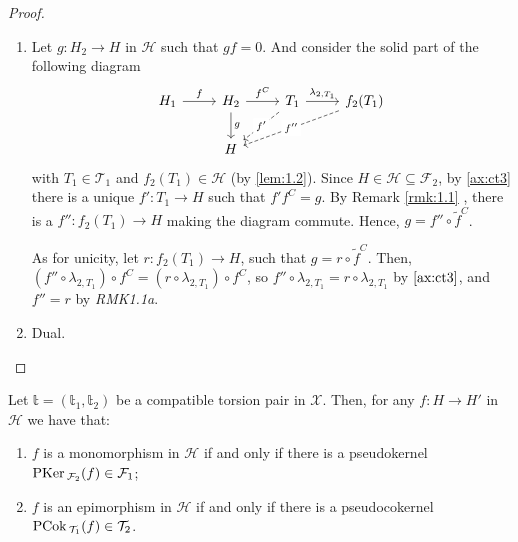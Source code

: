 \begin{proof}
  \begin{enumerate}[label=(\alph*)]
    \item Let $g:H_2\to H$ in $\mathcal{H}$ such that $gf=0$. And consider the solid part of
    the following diagram
    \begin{equation*}
      \begin{tikzcd}
        H_1\arrow{r}{f}
          & H_2\arrow{r}{f^C}\arrow{d}{g}
            & T_1\arrow[dashed]{dl}[description]{f'}\arrow{r}{\lambda_{2,T_1}}
              & f_2(T_1)\arrow[dashed]{dll}[description]{f''}\\
          & H
            & &
      \end{tikzcd}
    \end{equation*}
    with $T_1\in\mathcal{T}_1$ and $f_2(T_1)\in\mathcal{H}$ (by \cref{lem:1.2}).
    Since $H\in\mathcal{H}\subseteq \mathcal{F}_2$, by \ref{ax:ct3} there is a
    unique $f':T_1\to H$ such that $f'f^C=g$. By Remark \ref{rmk:1.1} ,
    there is a $f'':f_2(T_1)\to H$ making the diagram commute. Hence, $g=f''\circ \tilde{f}^C$.

    As for unicity, let $r:f_2(T_1)\to H$, such that $g=r\circ \tilde{f}^C$. Then,
    $(f''\circ\lambda_{2,T_1})\circ f^C = (r\circ \lambda_{2,T_1})\circ f^C$,
    so $f''\circ \lambda_{2,T_1}=r\circ \lambda_{2,T_1}$ by $\ref{ax:ct3}$, and $f''=r$ by \emph{RMK1.1a}.
    \item Dual.
  \end{enumerate}
\end{proof}

\begin{prop}\label{prop:1.4}
  Let $\mathbb{t}=(\mathbb{t}_1,\mathbb{t}_2)$ be a compatible torsion pair in $\mathcal{X}$. Then, for any $f:H\to H'$
  in $\mathcal{H}$ we have that:
  \begin{enumerate}[label=(\alph*)]
    \item\label{prop:1.4:a} $f$ is a monomorphism in $\mathcal{H}$ if and only if there is a pseudokernel
    $\mathrm{\textup{PKer\,}}_{\mathcal{F}_2}(f)\in\mathcal{F}_1$;
    \item\label{prop:1.4:b} $f$ is an epimorphism in $\mathcal{H}$ if and only if there is a pseudocokernel
    $\mathrm{\textup{PCok\,}}_{\mathcal{T}_1}(f)\in\mathcal{T}_2$.
  \end{enumerate}
\end{prop}

